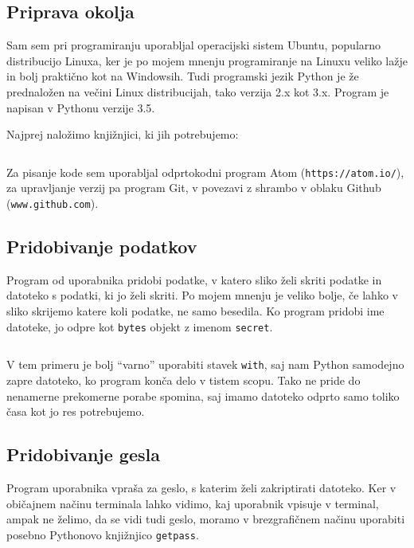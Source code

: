 \subsection{Priprava okolja}
    Sam sem pri programiranju uporabljal operacijski sistem Ubuntu, popularno distribucijo Linuxa, ker je po mojem mnenju programiranje na Linuxu veliko lažje in bolj praktično kot na Windowsih. Tudi programski jezik Python je že prednaložen na večini Linux distribucijah, tako verzija 2.x kot 3.x. Program je napisan v Pythonu verzije 3.5.

    Najprej naložimo knjižnjici, ki jih potrebujemo:

    \inputminted[firstline=1, lastline=2, frame=lines]{bash}{latex/bashscripts.sh}

    Za pisanje kode sem uporabljal odprtokodni program Atom (\texttt{https://atom.io/}), za upravljanje verzij pa program Git, v povezavi z shrambo v oblaku Github (\texttt{www.github.com}).


\subsection{Pridobivanje podatkov}

    Program od uporabnika pridobi podatke, v katero sliko želi skriti podatke in datoteko s podatki, ki jo želi skriti. Po mojem mnenju je veliko bolje, če lahko v sliko skrijemo katere koli podatke, ne samo besedila. Ko program pridobi ime datoteke, jo odpre kot \texttt{bytes} objekt z imenom \texttt{secret}.

    \inputminted[firstline=1, lastline=2, frame=lines]{python}{latex/code_parts.py}

    V tem primeru je bolj ``varno'' uporabiti stavek \texttt{with}, saj nam Python samodejno zapre datoteko, ko program konča delo v tistem scopu. Tako ne pride do nenamerne prekomerne porabe spomina, saj imamo datoteko odprto samo toliko časa kot jo res potrebujemo.


\subsection{Pridobivanje gesla}

    Program uporabnika vpraša za geslo, s katerim želi zakriptirati datoteko. Ker v običajnem načinu terminala lahko vidimo, kaj uporabnik vpisuje v terminal, ampak ne želimo, da se vidi tudi geslo, moramo v brezgrafičnem načinu uporabiti posebno Pythonovo knjižnjico \texttt{getpass}.


